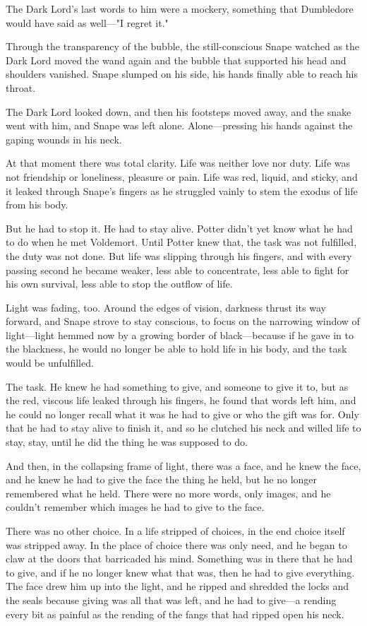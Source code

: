 The Dark Lord's last words to him were a mockery, something that Dumbledore would have said as well—"I regret it."

Through the transparency of the bubble, the still-conscious Snape watched as the Dark Lord moved the wand again and the bubble that supported his head and shoulders vanished. Snape slumped on his side, his hands finally able to reach his throat.

The Dark Lord looked down, and then his footsteps moved away, and the snake went with him, and Snape was left alone. Alone—pressing his hands against the gaping wounds in his neck.

At that moment there was total clarity. Life was neither love nor duty. Life was not friendship or loneliness, pleasure or pain. Life was red, liquid, and sticky, and it leaked through Snape's fingers as he struggled vainly to stem the exodus of life from his body.

But he had to stop it. He had to stay alive. Potter didn't yet know what he had to do when he met Voldemort. Until Potter knew that, the task was not fulfilled, the duty was not done. But life was slipping through his fingers, and with every passing second he became weaker, less able to concentrate, less able to fight for his own survival, less able to stop the outflow of life.

Light was fading, too. Around the edges of vision, darkness thrust its way forward, and Snape strove to stay conscious, to focus on the narrowing window of light—light hemmed now by a growing border of black—because if he gave in to the blackness, he would no longer be able to hold life in his body, and the task would be unfulfilled.

The task. He knew he had something to give, and someone to give it to, but as the red, viscous life leaked through his fingers, he found that words left him, and he could no longer recall what it was he had to give or who the gift was for. Only that he had to stay alive to finish it, and so he clutched his neck and willed life to stay, stay, until he did the thing he was supposed to do.

And then, in the collapsing frame of light, there was a face, and he knew the face, and he knew he had to give the face the thing he held, but he no longer remembered what he held. There were no more words, only images, and he couldn't remember which images he had to give to the face.

There was no other choice. In a life stripped of choices, in the end choice itself was stripped away. In the place of choice there was only need, and he began to claw at the doors that barricaded his mind. Something was in there that he had to give, and if he no longer knew what that was, then he had to give everything. The face drew him up into the light, and he ripped and shredded the locks and the seals because giving was all that was left, and he had to give—a rending every bit as painful as the rending of the fangs that had ripped open his neck.

